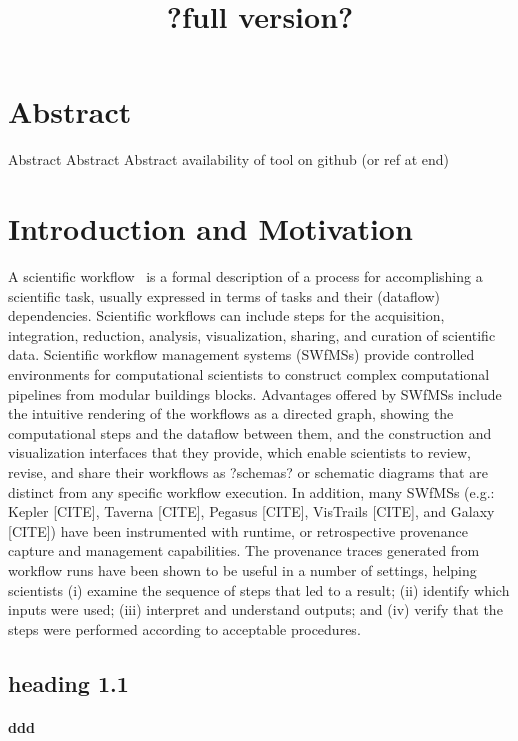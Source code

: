 \documentclass[paper]{ijdc-v9}
\begin{document}
\title[?short version?]{?full version?}
\maketitle

\section{Abstract}
Abstract Abstract   Abstract  
 availability of tool on github (or ref at end)
 

\section{Introduction and Motivation}

A scientific workflow~\cite{xie2013dynamic} is a formal description of a process for accomplishing a scientific task, usually expressed in terms of tasks and their (dataflow) dependencies. Scientific workflows can include steps for the acquisition, integration, reduction, analysis, visualization, sharing, and curation of scientific data.  Scientific workflow management systems (SWfMSs) provide controlled environments for computational scientists to construct complex computational pipelines from modular buildings blocks. Advantages offered by SWfMSs include the intuitive rendering of the workflows as a directed graph, showing the computational steps and the dataflow between them, and the construction and visualization interfaces that they provide, which enable scientists to review, revise, and share their workflows as ?schemas? or schematic diagrams that are distinct from any specific workflow execution. In addition, many SWfMSs (e.g.: Kepler [CITE], Taverna [CITE], Pegasus [CITE], VisTrails [CITE], and Galaxy [CITE]) have been instrumented with runtime, or retrospective provenance capture and management capabilities. The provenance traces generated from workflow runs have been shown to be useful in a number of settings, helping scientists (i) examine the sequence of steps that led to a result; (ii) identify which inputs were used; (iii) interpret and understand outputs; and (iv) verify that the steps were performed according to acceptable procedures. 

\subsection{heading 1.1}

\paragraph{ddd}
\end{document}
